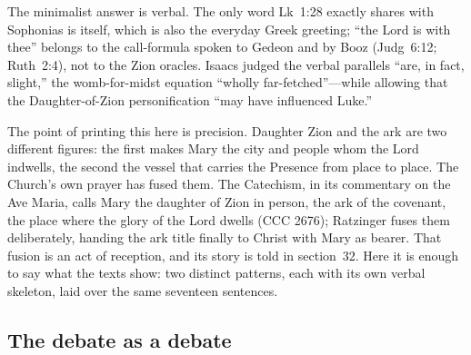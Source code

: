 The minimalist answer is verbal. The only word Lk~1:28 exactly shares
with Sophonias is  itself, which is also the everyday Greek
greeting; ``the Lord is with thee'' belongs to the call-formula spoken to
Gedeon and by Booz (Judg~6:12; Ruth~2:4), not to the Zion oracles. Isaacs
judged the verbal parallels ``are, in fact, slight,'' the womb-for-midst
equation ``wholly far-fetched''---while allowing that the
Daughter-of-Zion personification ``may have influenced Luke.''

The point of printing this here is precision. Daughter Zion and the ark
are two different figures: the first makes Mary the city and people whom
the Lord indwells, the second the vessel that carries the Presence from
place to place. The Church's own prayer has fused them. The Catechism, in
its commentary on the Ave Maria, calls Mary the daughter of Zion in
person, the ark of the covenant, the place where the glory of the Lord
dwells (CCC 2676); Ratzinger fuses them deliberately, handing the ark
title finally to Christ with Mary as bearer. That fusion is an act of
reception, and its story is told in section~32. Here it is enough to say
what the texts show: two distinct patterns, each with its own verbal
skeleton, laid over the same seventeen sentences.

\subsection{The debate as a debate}

